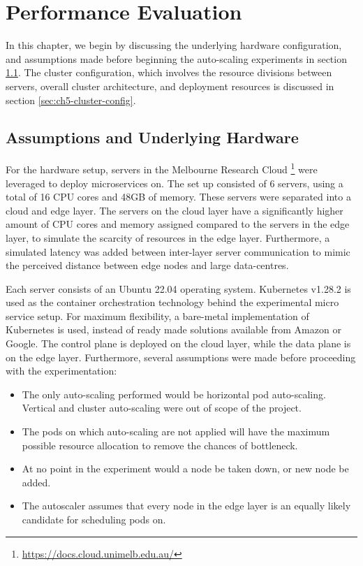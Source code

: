 \clearpage

\def\chaptertitle{Performance Evaluation}

\lhead{\emph{\chaptertitle}}

\chapter{\chaptertitle}
\label{ch:performance-evaluation}

In this chapter, we begin by discussing the underlying hardware configuration, and assumptions made before beginning the auto-scaling experiments in section \ref{sec:ch5-hardware-assumptions}. The cluster configuration, which involves the resource divisions between servers, overall cluster architecture, and deployment resources is discussed in section \ref{sec:ch5-cluster-config}.

\section{Assumptions and Underlying Hardware}
\label{sec:ch5-hardware-assumptions}

For the hardware setup, servers in the Melbourne Research Cloud \footnote{\url{https://docs.cloud.unimelb.edu.au/}} were leveraged to deploy microservices on. The set up consisted of 6 servers, using a total of 16 CPU cores and 48GB of memory. These servers were separated into a cloud and edge layer. The servers on the cloud layer have a significantly higher amount of CPU cores and memory assigned compared to the servers in the edge layer, to simulate the scarcity of resources in the edge layer. Furthermore, a simulated latency was added between inter-layer server communication to mimic the perceived distance between edge nodes and large data-centres.\par

Each server consists of an Ubuntu 22.04 operating system. Kubernetes v1.28.2 is used as the container orchestration technology behind the experimental micro service setup. For maximum flexibility, a bare-metal implementation of Kubernetes is used, instead of ready made solutions available from Amazon or Google. The control plane is deployed on the cloud layer, while the data plane is on the edge layer. Furthermore, several assumptions were made before proceeding with the experimentation:

\begin{itemize}
    \item The only auto-scaling performed would be horizontal pod auto-scaling. Vertical and cluster auto-scaling were out of scope of the project.
    \item The pods on which auto-scaling are not applied will have the maximum possible resource allocation to remove the chances of bottleneck.
    \item At no point in the experiment would a node be taken down, or new node be added.
    \item The autoscaler assumes that every node in the edge layer is an equally likely candidate for scheduling pods on.
\end{itemize}

